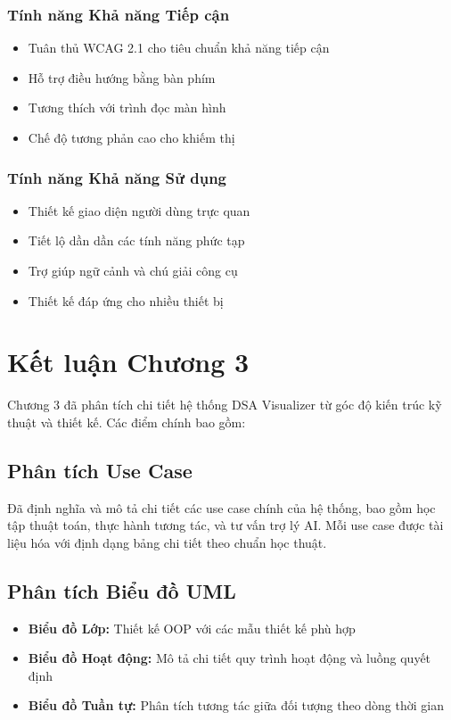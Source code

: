 \subsubsection{Tính năng Khả năng Tiếp cận}
\begin{itemize}
    \item Tuân thủ WCAG 2.1 cho tiêu chuẩn khả năng tiếp cận
    \item Hỗ trợ điều hướng bằng bàn phím
    \item Tương thích với trình đọc màn hình
    \item Chế độ tương phản cao cho khiếm thị
\end{itemize}

\subsubsection{Tính năng Khả năng Sử dụng}
\begin{itemize}
    \item Thiết kế giao diện người dùng trực quan
    \item Tiết lộ dần dần các tính năng phức tạp
    \item Trợ giúp ngữ cảnh và chú giải công cụ
    \item Thiết kế đáp ứng cho nhiều thiết bị
\end{itemize}

\section{Kết luận Chương 3}
\label{sec:chapter3-conclusion}

Chương 3 đã phân tích chi tiết hệ thống DSA Visualizer từ góc độ kiến trúc kỹ thuật và thiết kế. Các điểm chính bao gồm:

\subsection{Phân tích Use Case}
Đã định nghĩa và mô tả chi tiết các use case chính của hệ thống, bao gồm học tập thuật toán, thực hành tương tác, và tư vấn trợ lý AI. Mỗi use case được tài liệu hóa với định dạng bảng chi tiết theo chuẩn học thuật.

\subsection{Phân tích Biểu đồ UML}
\begin{itemize}
    \item \textbf{Biểu đồ Lớp:} Thiết kế OOP với các mẫu thiết kế phù hợp
    \item \textbf{Biểu đồ Hoạt động:} Mô tả chi tiết quy trình hoạt động và luồng quyết định
    \item \textbf{Biểu đồ Tuần tự:} Phân tích tương tác giữa đối tượng theo dòng thời gian
\end{itemize}

